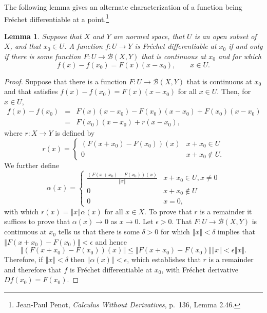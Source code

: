 \documentclass{article}
\newcommand{\norm}[1]{\left\Vert #1 \right\Vert}
\newtheorem{lemma}[theorem]{Lemma}
\theoremstyle{definition}
\begin{document}
The following lemma gives an alternate characterization of a function being Fr\'echet differentiable
at a point.\footnote{Jean-Paul Penot, {\em Calculus Without Derivatives}, p.~136, Lemma 2.46.}

\begin{lemma}
Suppose that $X$ and $Y$ are normed space, that $U$ is an open subset of $X$, and that $x_0 \in U$. A function
$f:U \to Y$ is Fr\'echet differentiable at $x_0$ if and only if there is some function
$F:U \to \mathscr{B}(X,Y)$ that is continuous at $x_0$ and for which
\[
f(x)-f(x_0)=F(x)(x-x_0), \qquad x \in U.
\]
\end{lemma}
\begin{proof}
Suppose that there is a function $F:U \to \mathscr{B}(X,Y)$ that is continuous at $x_0$ and that satisfies
$f(x)-f(x_0)=F(x)(x-x_0)$ for all $x \in U$. Then, for $x \in U$,
\begin{eqnarray*}
f(x)-f(x_0)&=&F(x)(x-x_0)-F(x_0)(x-x_0)+F(x_0)(x-x_0)\\
&=&F(x_0)(x-x_0)+r(x-x_0),
\end{eqnarray*}
where   $r:X \to Y$ is defined by
\[
r(x)=\begin{cases}
(F(x+x_0)-F(x_0))(x)&x+x_0 \in U\\
0&x+x_0 \not \in U.
\end{cases}
\]
We further define
\[
\alpha(x) = \begin{cases}
\frac{(F(x+x_0)-F(x_0))(x)}{\norm{x}}&x+x_0 \in U, x \neq 0\\
0&x+x_0 \not \in U\\
0&x=0,
\end{cases}
\]
with which $r(x)=\norm{x}\alpha(x)$ for all $x \in X$. To prove that $r$ is a remainder it suffices to prove that
$\alpha(x) \to 0$ as $x \to 0$. Let $\epsilon>0$.
That $F:U \to \mathscr{B}(X,Y)$ is continuous at $x_0$ tells us that there is some $\delta>0$ for which
$\norm{x}<\delta$ implies that $\norm{F(x+x_0)-F(x_0)}<\epsilon$ and hence 
\[
\norm{(F(x+x_0)-F(x_0))(x)} \leq \norm{F(x+x_0)-F(x_0)} \norm{x} < \epsilon \norm{x}.
\]
Therefore, if $\norm{x}<\delta$ then
$\norm{\alpha(x)} < \epsilon$, which establishes that $r$ is a remainder and therefore that
$f$ is Fr\'echet differentiable at $x_0$, with Fr\'echet derivative $Df(x_0)=F(x_0)$.


\end{proof}
\end{document}

